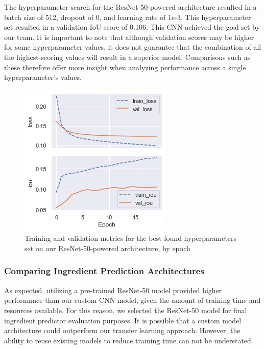 \documentclass[10pt,twocolumn,letterpaper]{article}
\begin{document}
The hyperparameter search for the ResNet-50-powered architecture resulted in a batch size of 512, dropout of 0, and learning rate of 1e-3. This hyperparameter set resulted in a validation IoU score of 0.106. This CNN achieved the goal set by our team. It is important to note that although validation scores may be higher for some hyperparameter values, it does not guarantee that the combination of all the highest-scoring values will result in a superior model. Comparisons such as these therefore offer more insight when analyzing performance across a single hyperparameter's values.

\begin{figure}[t]
\begin{center}
   \includegraphics[width=0.7\linewidth]{best-resnet-run.png}
\end{center}
\caption{Training and validation metrics for the best found hyperparameters set on our ResNet-50-powered architecture, by epoch}
\label{fig:onecol}
\end{figure}

\subsubsection{Comparing Ingredient Prediction Architectures}
As expected, utilizing a pre-trained ResNet-50 model provided higher performance than our custom CNN model, given the amount of training time and resources available. For this reason, we selected the ResNet-50 model for final ingredient predictor evaluation purposes. It is possible that a custom model architecture could outperform our transfer learning approach. However, the ability to reuse existing models to reduce training time can not be understated.
\end{document}
